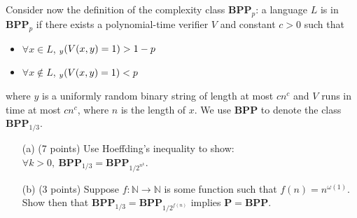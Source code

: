 \documentclass[12pt]{article}
\let\Pr\relax
\DeclareMathOperator*{\Pr}{\mathbb{P}}
\begin{document}
Consider now the definition of the complexity class $\mathbf{BPP}_p$: a language $L$ is in $\mathbf{BPP}_p$ if there exists a polynomial-time verifier $V$ and constant $c>0$ such that 
\begin{itemize}
\item $\forall x\in L$, $\Pr_y(V(x,y) = 1) > 1-p$
\vspace{-.1in}\item $\forall x\notin L$, $\Pr_y(V(x,y) = 1) < p$
\end{itemize}
where $y$ is a uniformly random binary string of length at most $cn^c$ and $V$ runs in time at most $cn^c$, where $n$ is the length of $x$. We use $\mathbf{BPP}$ to denote the class $\mathbf{BPP}_{1/3}$.

\begin{itemize}
\item[(a)] (7 points) Use Hoeffding's inequality to show: $\forall k>0,\ \mathbf{BPP}_{1/3} = \mathbf{BPP}_{1/2^{n^k}}$.
\item[(b)] (3 points) Suppose $f:\mathbb{N}\rightarrow\mathbb{N}$ is some function such that $f(n) = n^{\omega(1)}$. Show then that $\mathbf{BPP}_{1/3} = \mathbf{BPP}_{1/2^{f(n)}}$ implies $\mathbf{P} = \mathbf{BPP}$.
\end{itemize}
\end{document}
